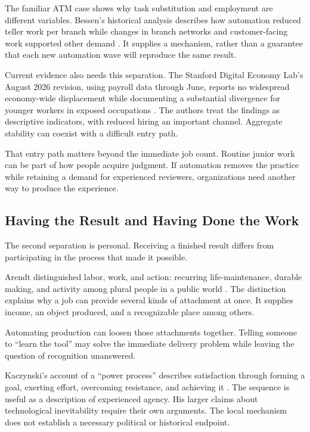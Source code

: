The familiar ATM case shows why task substitution and employment are different variables. Bessen's historical analysis describes how automation reduced teller work per branch while changes in branch networks and customer-facing work supported other demand \cite{bessen2015learning}. It supplies a mechanism, rather than a guarantee that each new automation wave will reproduce the same result.

Current evidence also needs this separation. The Stanford Digital Economy Lab's August 2026 revision, using payroll data through June, reports no widespread economy-wide displacement while documenting a substantial divergence for younger workers in exposed occupations \cite{brynjolfsson2026canaries}. The authors treat the findings as descriptive indicators, with reduced hiring an important channel. Aggregate stability can coexist with a difficult entry path.

That entry path matters beyond the immediate job count. Routine junior work can be part of how people acquire judgment. If automation removes the practice while retaining a demand for experienced reviewers, organizations need another way to produce the experience.

\subsection{Having the Result and Having Done the Work}

The second separation is personal. Receiving a finished result differs from participating in the process that made it possible.

Arendt distinguished labor, work, and action: recurring life-maintenance, durable making, and activity among plural people in a public world \cite{arendt1958human}. The distinction explains why a job can provide several kinds of attachment at once. It supplies income, an object produced, and a recognizable place among others.

Automating production can loosen those attachments together. Telling someone to “learn the tool” may solve the immediate delivery problem while leaving the question of recognition unanswered.

Kaczynski's account of a “power process” describes satisfaction through forming a goal, exerting effort, overcoming resistance, and achieving it \cite{kaczynski1995industrial}. The sequence is useful as a description of experienced agency. His larger claims about technological inevitability require their own arguments. The local mechanism does not establish a necessary political or historical endpoint.

